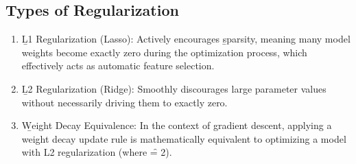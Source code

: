 \subsection{Types of Regularization}

\begin{enumerate}
    \item \b{L1 Regularization (Lasso)}: Actively encourages \b{sparsity}, meaning many model weights become exactly zero during the optimization process, which effectively acts as automatic feature selection.
    \item \b{L2 Regularization (Ridge)}: Smoothly discourages large parameter values without necessarily driving them to exactly zero.
    \item \b{Weight Decay Equivalence}: In the context of gradient descent, applying a weight decay update rule is mathematically equivalent to optimizing a model with L2 regularization (where \f{\alpha = 2\mu\lambda}).
\end{enumerate}

